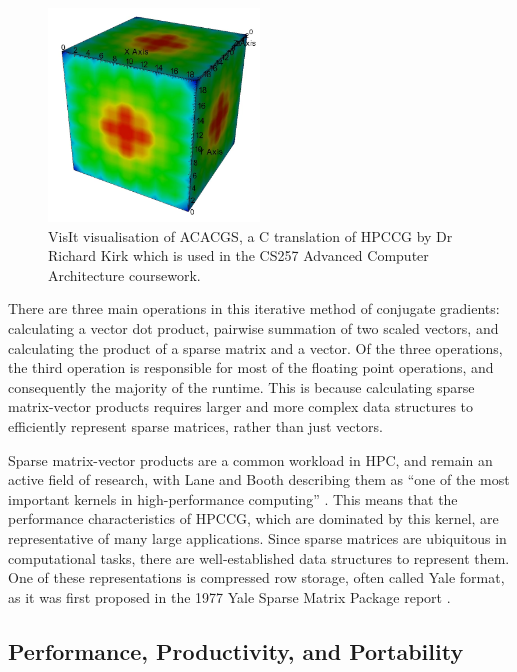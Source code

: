 \begin{figure}[H]
    \centering
    \includegraphics[width=0.5\textwidth]{images/2_background/acacgs_silo_output.png}
    \caption{VisIt visualisation of ACACGS, a C translation of \acrshort{HPCCG} by Dr Richard Kirk which is used in the CS257 Advanced Computer Architecture coursework.}
    \label{fig:acacgs_silo_output}
\end{figure}

There are three main operations in this iterative method of conjugate gradients: calculating a vector dot product, pairwise summation of two scaled vectors, and calculating the product of a sparse matrix and a vector. Of the three operations, the third operation is responsible for most of the floating point operations, and consequently the majority of the runtime. This is because calculating sparse matrix-vector products requires larger and more complex data structures to efficiently represent sparse matrices, rather than just vectors.

Sparse matrix-vector products are a common workload in \acrshort{HPC}, and remain an active field of research, with Lane and Booth describing them as ``one of the most important kernels in high-performance computing'' \cite{laneHeterogeneousSparseMatrixVector2023}. This means that the performance characteristics of \acrshort{HPCCG}, which are dominated by this kernel, are representative of many large applications. Since sparse matrices are ubiquitous in computational tasks, there are well-established data structures to represent them. One of these representations is compressed row storage, often called Yale format, as it was first proposed in the 1977 Yale Sparse Matrix Package report \cite{eisenstat1977yale}.

\subsection{Performance, Productivity, and Portability}
\label{ssec:p3hpc}

